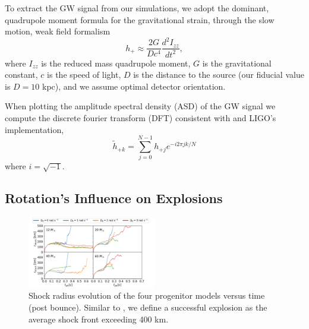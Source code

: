 \documentclass[twocolumn,times]{aastex62}  %
\begin{document}
To extract the GW signal from our simulations, we adopt the dominant, quadrupole moment formula for the gravitational strain, through the slow motion, weak field formalism %
\citep[eg.][]{finn:1990,blanchet:1990}
\begin{equation}
    h_+ \approx \frac{2G}{Dc^4}
    \frac{d^2I_{zz}}{dt^2},
\label{eq:quad}
\end{equation}
where $I_{zz}$ is the reduced mass quadrupole moment, $G$ is the gravitational constant, $c$ is the speed of light, $D$ is the distance to the source (our fiducial value is $D=10$ kpc), and we assume optimal detector orientation.\\
\par When plotting the amplitude spectral density (ASD) of the GW signal we compute the discrete fourier transform (DFT) consistent with \citet{anderson:2004} and LIGO's implementation,
\begin{equation}
\widetilde{h}_{+k} = \sum^{N-1}_{j=0} h_{+j} e^{-i2\pi jk/N}
\label{eq:dft}
\end{equation}
where $i=\sqrt{-1}$.

\subsection{Rotation's Influence on Explosions}

\begin{figure}[t]
    \centering
    \includegraphics[width = 0.5\textwidth]{figures/M1_shock_mass_top_legend.pdf}
    \caption{Shock radius evolution of the four  progenitor models versus time (post bounce).  Similar to \citet{couch:2013b}, we define a successful explosion as the average shock front exceeding 400 km. }
    \label{fig:shock}
\end{figure} 
\end{document}
